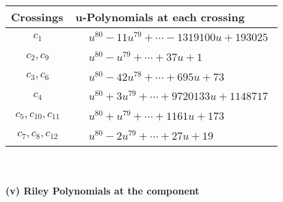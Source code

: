 \documentclass[1p]{elsarticle_modified}
\theoremstyle{definition}
\begin{document}
\begin{tabular}{m{50pt}|m{274pt}}
Crossings & \hspace{64pt}u-Polynomials at each crossing \\
\hline $$\begin{aligned}c_{1}\end{aligned}$$&$\begin{aligned}
&u^{80}-11 u^{79}+\cdots-1319100 u+193025
\end{aligned}$\\
\hline $$\begin{aligned}c_{2},c_{9}\end{aligned}$$&$\begin{aligned}
&u^{80}- u^{79}+\cdots+37 u+1
\end{aligned}$\\
\hline $$\begin{aligned}c_{3},c_{6}\end{aligned}$$&$\begin{aligned}
&u^{80}-42 u^{78}+\cdots+695 u+73
\end{aligned}$\\
\hline $$\begin{aligned}c_{4}\end{aligned}$$&$\begin{aligned}
&u^{80}+3 u^{79}+\cdots+9720133 u+1148717
\end{aligned}$\\
\hline $$\begin{aligned}c_{5},c_{10},c_{11}\end{aligned}$$&$\begin{aligned}
&u^{80}+u^{79}+\cdots+1161 u+173
\end{aligned}$\\
\hline $$\begin{aligned}c_{7},c_{8},c_{12}\end{aligned}$$&$\begin{aligned}
&u^{80}-2 u^{79}+\cdots+27 u+19
\end{aligned}$\\
\hline
\end{tabular}\\~\\
\newpage\renewcommand{\arraystretch}{1}
\flushleft \textbf{(v) Riley Polynomials at the component}\newline \\
\end{document}
